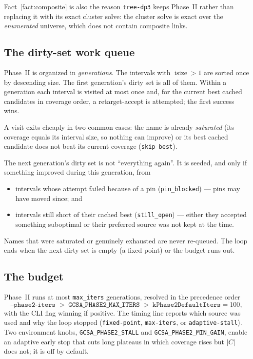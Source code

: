 \documentclass[11pt,a4paper]{article}
\theoremstyle{definition}
\theoremstyle{plain}
\theoremstyle{remark}
\newcommand{\isize}{\operatorname{isize}}
\begin{document}
Fact~\ref{fact:composite} is also the reason \texttt{tree-dp3} keeps
Phase~II rather than replacing it with its exact cluster solve: the
cluster solve is exact over the \emph{enumerated} universe, which does
not contain composite links.

\subsection{The dirty-set work queue}

Phase~II is organized in \emph{generations}. The intervals with
$\isize > 1$ are sorted once by descending size. The first generation's
dirty set is all of them. Within a generation each interval is visited
at most once and, for the current best cached candidates in coverage
order, a retarget-accept is attempted; the first success wins.

A visit exits cheaply in two common cases: the name is already
\emph{saturated} (its coverage equals its interval size, so nothing can
improve) or its best cached candidate does not beat its current coverage
(\texttt{skip\_best}).

The next generation's dirty set is not ``everything again''. It is
seeded, and only if something improved during this generation, from
\begin{itemize}
\item intervals whose attempt failed because of a pin
  (\texttt{pin\_blocked}) --- pins may have moved since; and
\item intervals still short of their cached best (\texttt{still\_open})
  --- either they accepted something suboptimal or their preferred
  source was not kept at the time.
\end{itemize}
Names that were saturated or genuinely exhausted are never re-queued.
The loop ends when the next dirty set is empty (a fixed point) or the
budget runs out.

\subsection{The budget}

Phase~II runs at most \texttt{max\_iters} generations, resolved in the
precedence order
\[
  \texttt{--phase2-iters} \;>\;
  \texttt{GCSA\_PHASE2\_MAX\_ITERS} \;>\;
  \texttt{kPhase2DefaultIters} = 100 ,
\]
with the CLI flag winning if positive. The timing line reports which
source was used and why the loop stopped
(\texttt{fixed-point}, \texttt{max-iters}, or \texttt{adaptive-stall}).
Two environment knobs, \texttt{GCSA\_PHASE2\_STALL} and
\texttt{GCSA\_PHASE2\_MIN\_GAIN}, enable an adaptive early stop that
cuts long plateaus in which coverage rises but $|C|$ does not; it is off
by default.
\end{document}
